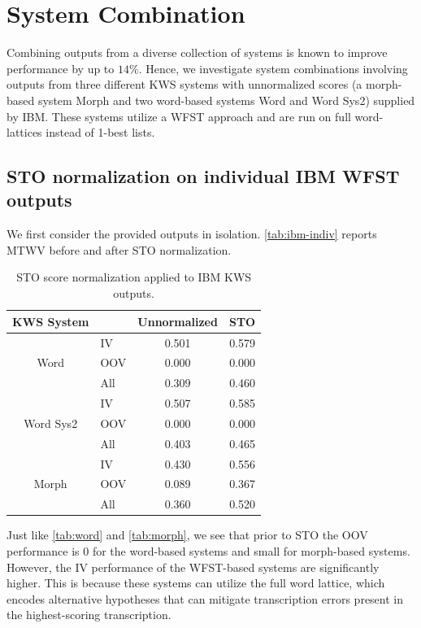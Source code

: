 \documentclass[a4paper,oneside,reqno]{amsart}
\begin{document}
\section{System Combination}

Combining outputs from a diverse collection of systems is known to improve
performance by up to $14\%$\cite{mamou2013system}. Hence, we investigate system
combinations involving outputs from three different KWS systems with
unnormalized scores (a morph-based system Morph and two word-based systems
Word and Word Sys2) supplied by IBM. These systems utilize a WFST
approach and are run on full word-lattices instead of 1-best lists.

\subsection{STO normalization on individual IBM WFST outputs}

We first consider the provided outputs in isolation. \autoref{tab:ibm-indiv}
reports MTWV before and after STO normalization.

\begin{table}[ht!]
  \begin{tabular}{clcc}
    \toprule
    KWS System                 &     & Unnormalized & STO \\
    \midrule
    \multirow{3}{*}{Word}      & IV  & 0.501 & 0.579\\
                               & OOV & 0.000 & 0.000\\
                               & All & 0.309 & 0.460\\
                               \hline
    \multirow{3}{*}{Word Sys2} & IV  & 0.507 & 0.585\\
                               & OOV & 0.000 & 0.000\\
                               & All & 0.403 & 0.465\\
                               \hline
    \multirow{3}{*}{Morph}     & IV  & 0.430 & 0.556\\
                               & OOV & 0.089 & 0.367\\
                               & All & 0.360 & 0.520\\
    \bottomrule
  \end{tabular}
  \caption{STO score normalization applied to IBM KWS outputs.}
  \label{tab:ibm-indiv}
\end{table}

Just like \autoref{tab:word} and \autoref{tab:morph}, we see that prior to STO
the OOV performance is $0$ for the word-based systems and small for morph-based
systems.  However, the IV performance of the WFST-based systems are
significantly higher.  This is because these systems can utilize the full word
lattice, which encodes alternative hypotheses that can mitigate transcription
errors present in the highest-scoring transcription.
\end{document}

